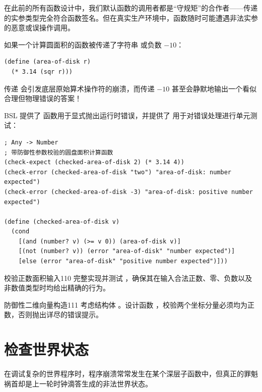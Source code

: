 在此前的所有函数设计中，我们默认函数的调用者都是“守规矩”的合作者——传递的实参类型完全符合函数签名。但在真实生产环境中，函数随时可能遭遇非法实参的恶意或误操作调用。

如果一个计算圆面积的函数被传递了字符串  或负数 $-10$：
\begin{lstlisting}[language=BSL]
(define (area-of-disk r)
  (* 3.14 (sqr r)))
\end{lstlisting}
传递  会引发底层原始算术操作符的崩溃，而传递 $-10$ 甚至会静默地输出一个看似合理但物理错误的答案！

BSL 提供了  函数用于显式抛出运行时错误，并提供了  用于对错误处理进行单元测试：

\begin{lstlisting}[language=BSL]
; Any -> Number
; 带防御性参数校验的圆盘面积计算函数
(check-expect (checked-area-of-disk 2) (* 3.14 4))
(check-error (checked-area-of-disk "two") "area-of-disk: number expected")
(check-error (checked-area-of-disk -3) "area-of-disk: positive number expected")

(define (checked-area-of-disk v)
  (cond
    [(and (number? v) (>= v 0)) (area-of-disk v)]
    [(not (number? v)) (error "area-of-disk" "number expected")]
    [else (error "area-of-disk" "positive number expected")]))
\end{lstlisting}

\begin{exercise}{校验正数面积输入}{110}
完整实现并测试 ，确保其在输入合法正数、零、负数以及非数值类型时均给出精确的行为。
\end{exercise}

\begin{exercise}{防御性二维向量构造}{111}
考虑结构体 。设计函数 ，校验两个坐标分量必须均为正数，否则抛出详尽的错误提示。
\end{exercise}

\section{检查世界状态}
\label{sec:6.4_checking_the_world}

在调试复杂的世界程序时，程序崩溃常常发生在某个深层子函数中，但真正的罪魁祸首却是上一轮时钟滴答生成的非法世界状态。

